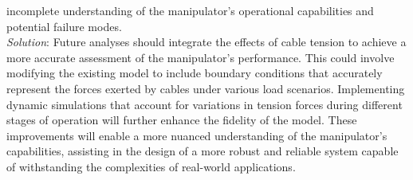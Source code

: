 \begin{itemize}
    incomplete understanding of the manipulator's operational capabilities and potential failure modes. \\
    \textit{Solution}: Future analyses should integrate the effects of cable tension to achieve a more accurate 
    assessment of the manipulator's performance. This could involve modifying the existing model to include 
    boundary conditions that accurately represent the forces exerted by cables under various load scenarios. 
    Implementing dynamic simulations that account for variations in tension forces during different stages of 
    operation will further enhance the fidelity of the model. These improvements will enable a more nuanced 
    understanding of the manipulator's capabilities, assisting in the design of a more robust and reliable 
    system capable of withstanding the complexities of real-world applications. 
\end{itemize}
